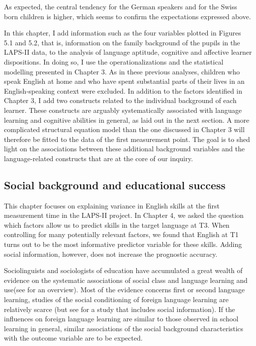 \documentclass[output=paper]{langsci/langscibook}
\begin{document}
As expected, the central tendency for the German speakers and for the Swiss born children is higher, which seems to confirm the expectations expressed above.

In this chapter, I add information such as the four variables plotted in Figures 5.1 and 5.2, that is, information on the family background of the pupils in the LAPS-II data, to the analysis of language aptitude, cognitive and affective learner dispositions. In doing so, I use the operationalizations and the statistical modelling presented in Chapter 3. As in these previous analyses, children who speak English at home and who have spent substantial parts of their lives in an English-speaking context were excluded. In addition to the factors identified in Chapter 3, I add two constructs related to the individual background of each learner. These constructs are arguably systematically associated with language learning and cognitive abilities in general, as laid out in the next section. A more complicated structural equation model than the one discussed in Chapter 3 will therefore be fitted to the data of the first measurement point. The goal is to shed light on the associations between these additional background variables and the language-related constructs that are at the core of our inquiry.

\subsection{Social background and educational success}

This chapter focuses on explaining variance in English skills at the first measurement time in the LAPS-II project. In Chapter 4, we asked the question which factors allow us to predict skills in the target language at T3. When controlling for many potentially relevant factors, we found that English at T1 turns out to be the most informative predictor variable for these skills. Adding social information, however, does not increase the prognostic accuracy.

Sociolinguists and sociologists of education have accumulated a great wealth of evidence on the systematic associations of social class and language learning and use(see \citealt{AvineriJohnson2015} for an overview). Most of the evidence concerns first or second language learning, studies of the social conditioning of foreign language learning are relatively scarce (but see \citealt{Klieme2008} for a study that includes social information). If the influences on foreign language learning are similar to those observed in school learning in general, similar associations of the social background characteristics with the outcome variable are to be expected. 
\end{document}
